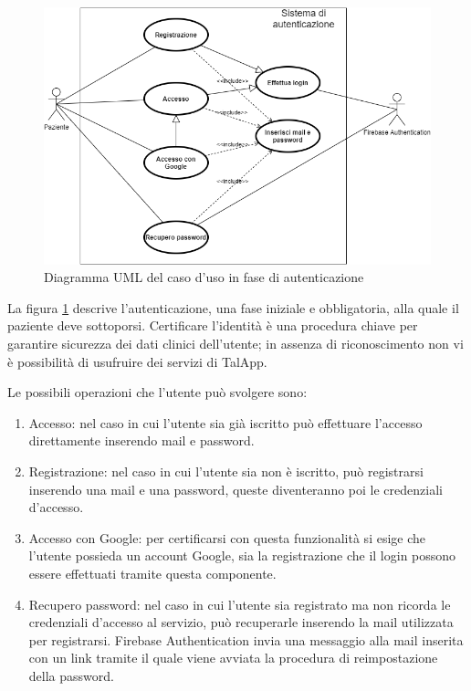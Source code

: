 \documentclass[12pt,a4paper,openright,twoside]{report}
\begin{document}
\begin{figure}[h]
\begin{center}
\includegraphics[width= 1\textwidth, height=1\textheight, keepaspectratio]{img/Diagrammi/Diagrammi-Autenticazione.png}
\caption{Diagramma UML del caso d'uso in fase di autenticazione} \label{2.1}
\end{center}
\end{figure}

La figura \ref{2.1} descrive l'autenticazione, una fase iniziale e obbligatoria, alla quale il paziente deve sottoporsi. Certificare l'identità è una procedura chiave per garantire sicurezza dei dati clinici dell'utente; in assenza di riconoscimento non vi è possibilità di usufruire dei servizi di TalApp.

Le possibili operazioni che l'utente può svolgere sono: 
\begin{enumerate}
    \item Accesso: nel caso in cui l'utente sia già iscritto può effettuare l'accesso direttamente inserendo mail e password.
    \item Registrazione: nel caso in cui l'utente sia non è iscritto, può registrarsi inserendo una mail e una password, queste diventeranno poi le credenziali d'accesso.
    \item Accesso con Google: per certificarsi con questa funzionalità si esige che l'utente possieda un account Google, sia la registrazione che il login possono essere effettuati tramite questa componente.
    \item Recupero password: nel caso in cui l'utente sia registrato ma non ricorda le credenziali d'accesso al servizio, può recuperarle inserendo la mail utilizzata per registrarsi. Firebase Authentication invia una messaggio alla mail inserita con un link tramite il quale viene avviata la procedura di reimpostazione della password.
\end{enumerate}
\end{document}
